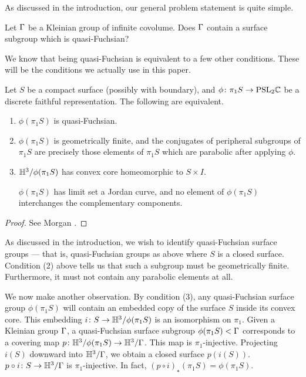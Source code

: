 As discussed in the introduction, our general problem statement is quite
simple.

\begin{prob}

Let $\Gamma$ be a Kleinian group of infinite covolume. Does $\Gamma$ contain
a surface subgroup which is quasi-Fuchsian?

\end{prob}

We know that being quasi-Fuchsian is equivalent to a few other conditions.
These will be the conditions we actually use in this paper.

\begin{prop}

Let $S$ be a compact surface (possibly with boundary), and $\phi \colon \pi_1S
\to \mathrm{PSL}_2\mathbb{C}$ be a discrete faithful representation. The following are
equivalent.

\begin{enumerate}

\item $\phi(\pi_1S)$ is quasi-Fuchsian.

\item $\phi(\pi_1S)$ is geometrically finite, and the conjugates of peripheral
subgroups of $\pi_1S$ are precisely those elements of $\pi_1S$ which are
parabolic after applying $\phi$.

\item $\mathbb{H}^3/\phi(\pi_1S)$ has convex core homeomorphic to $S \times I$.

$\phi(\pi_1S)$ has limit set a Jordan curve, and no element of $\phi(\pi_1S)$
interchanges the complementary components.

\end{enumerate}

\end{prop}

\begin{proof}

See Morgan \cite[Proposition 9.2]{Mo}.%

\end{proof}

As discussed in the introduction, we wish to identify quasi-Fuchsian surface
groups --- that is, quasi-Fuchsian groups as above where $S$ is a closed
surface.  Condition (2) above tells us that such a subgroup must be
geometrically finite.  Furthermore, it must not contain any parabolic elements
at all.

We now make another observation. By condition (3), any quasi-Fuchsian surface
group $\phi(\pi_1S)$ will contain an embedded copy of the surface $S$ inside
its convex core.  This embedding $i \colon S \to \mathbb{H}^3/\phi(\pi_1S)$ is an
isomorphism on $\pi_1$.  Given a Kleinian group $\Gamma$, a quasi-Fuchsian surface
subgroup $\phi(\pi_1S) < \Gamma$ corresponds to a covering map $p \colon
\mathbb{H}^3/\phi(\pi_1S) \to \mathbb{H}^3/\Gamma$. This map is $\pi_1$-injective.  Projecting
$i(S)$ downward into $\mathbb{H}^3/\Gamma$, we obtain a closed surface $p(i(S))$. $p
\circ i \colon S \to \mathbb{H}^3/\Gamma$ is $\pi_1$-injective. In fact, $(p \circ
i)_\star(\pi_1S) = \phi(\pi_1S)$.

